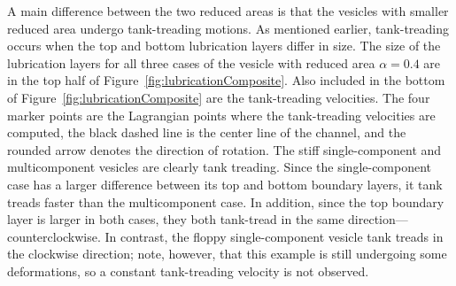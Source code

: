 \documentclass[twoside,twocolumn,9pt]{article}
\begin{document}
A main difference between the two reduced areas is that the vesicles
with smaller reduced area undergo tank-treading motions. As mentioned
earlier, tank-treading occurs when the top and bottom lubrication layers
differ in size. The size of the lubrication layers for all three cases
of the vesicle with reduced area $\alpha = 0.4$ are in the top half of
Figure~\ref{fig:lubricationComposite}. Also included in the bottom of
Figure~\ref{fig:lubricationComposite} are the tank-treading velocities.
The four marker points are the Lagrangian points where the tank-treading
velocities are computed, the black dashed line is the center line of the
channel, and the rounded arrow denotes the direction of rotation. The
stiff single-component and multicomponent vesicles are clearly tank
treading. Since the single-component case has a larger difference
between its top and bottom boundary layers, it tank treads faster than
the multicomponent case. In addition, since the top boundary layer is
larger in both cases, they both tank-tread in the same
direction---counterclockwise. In contrast, the floppy single-component
vesicle tank treads in the clockwise direction; note, however, that this
example is still undergoing some deformations, so a constant
tank-treading velocity is not observed.


\end{document}
